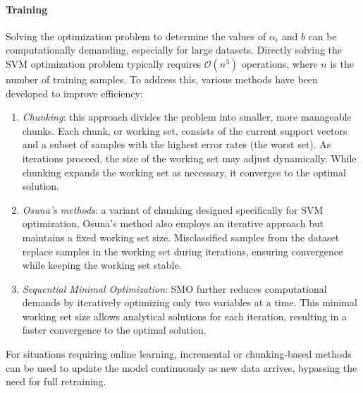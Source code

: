 \paragraph*{Training}
Solving the optimization problem to determine the values of $\alpha_i$ and $b$ can be computationally demanding, especially for large datasets.
Directly solving the SVM optimization problem typically requires $\mathcal{O}(n^3)$ operations, where $n$ is the number of training samples. 
To address this, various methods have been developed to improve efficiency:
\begin{enumerate}
    \item \textit{Chunking}: this approach divides the problem into smaller, more manageable chunks. 
        Each chunk, or working set, consists of the current support vectors and a subset of samples with the highest error rates (the worst set). 
        As iterations proceed, the size of the working set may adjust dynamically. 
        While chunking expands the working set as necessary, it converges to the optimal solution.
    \item \textit{Osuna's methods}: a variant of chunking designed specifically for SVM optimization, Osuna's method also employs an iterative approach but maintains a fixed working set size. 
        Misclassified samples from the dataset replace samples in the working set during iterations, ensuring convergence while keeping the working set stable.
    \item \textit{Sequential Minimal Optimization}: SMO further reduces computational demands by iteratively optimizing only two variables at a time. 
        This minimal working set size allows analytical solutions for each iteration, resulting in a faster convergence to the optimal solution.
\end{enumerate}
For situations requiring online learning, incremental or chunking-based methods can be used to update the model continuously as new data arrives, bypassing the need for full retraining.

